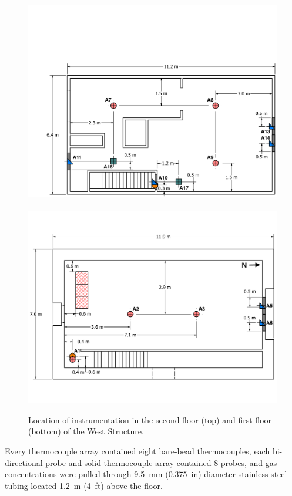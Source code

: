 \documentclass[12pt,oneside]{book}
\begin{document}
\begin{figure}[!ht]
	\includegraphics[width=0.94\columnwidth]{../Figures/Floor_Plans/West_Structure_2nd_Floor_Dimensioned_Instrumentation}
	\\~\\
	\includegraphics[width=\columnwidth]{../Figures/Floor_Plans/West_Structure_1st_Floor_Dimensioned_Instrumentation}
	\caption[Location of instrumentation in the West Structure.]{Location of instrumentation in the second floor (top) and first floor (bottom) of the West Structure.}
	\label{fig:west_instrumentation}
\end{figure}

Every thermocouple array contained eight bare-bead thermocouples, each bi-directional probe and solid thermocouple array contained 8 probes, and gas concentrations were pulled through 9.5~mm (0.375~in) diameter stainless steel tubing located 1.2~m (4~ft) above the floor.
\clearpage
\end{document}
